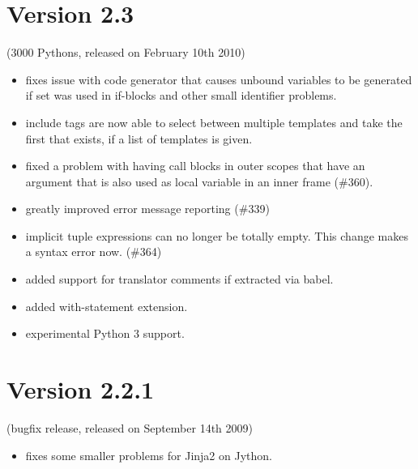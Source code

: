 \documentclass[a4paper,10pt,english]{sphinxmanual}
\begin{document}
\section{Version 2.3}
\label{changelog:version-2-3}
(3000 Pythons, released on February 10th 2010)
\begin{itemize}
\item {} 
fixes issue with code generator that causes unbound variables
to be generated if set was used in if-blocks and other small
identifier problems.

\item {} 
include tags are now able to select between multiple templates
and take the first that exists, if a list of templates is
given.

\item {} 
fixed a problem with having call blocks in outer scopes that
have an argument that is also used as local variable in an
inner frame (\#360).

\item {} 
greatly improved error message reporting (\#339)

\item {} 
implicit tuple expressions can no longer be totally empty.
This change makes  a syntax error
now. (\#364)

\item {} 
added support for translator comments if extracted via babel.

\item {} 
added with-statement extension.

\item {} 
experimental Python 3 support.

\end{itemize}


\section{Version 2.2.1}
\label{changelog:version-2-2-1}
(bugfix release, released on September 14th 2009)
\begin{itemize}
\item {} 
fixes some smaller problems for Jinja2 on Jython.

\end{itemize}
\end{document}
